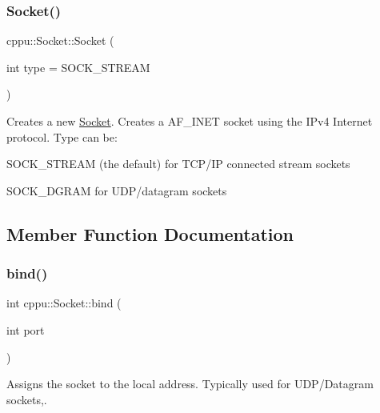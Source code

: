 \subsubsection{\texorpdfstring{Socket()}{Socket()}}
{\footnotesize\ttfamily cppu\+::\+Socket\+::\+Socket (\begin{DoxyParamCaption}\item[{int}]{type = {\ttfamily SOCK\+\_\+STREAM} }\end{DoxyParamCaption})}



Creates a new \mbox{\hyperlink{classcppu_1_1_socket}{Socket}}. Creates a A\+F\+\_\+\+I\+N\+ET socket using the I\+Pv4 Internet protocol. Type can be\+: 


\begin{DoxyItemize}
\item S\+O\+C\+K\+\_\+\+S\+T\+R\+E\+AM (the default) for T\+C\+P/\+IP connected stream sockets
\item S\+O\+C\+K\+\_\+\+D\+G\+R\+AM for U\+D\+P/datagram sockets 
\end{DoxyItemize}

\subsection{Member Function Documentation}
\mbox{\label{classcppu_1_1_socket_a7b876dcaff0babaffde41575f9b19d64}} 
\subsubsection{\texorpdfstring{bind()}{bind()}\hspace{0.1cm}{\footnotesize\ttfamily [1/2]}}
{\footnotesize\ttfamily int cppu\+::\+Socket\+::bind (\begin{DoxyParamCaption}\item[{int}]{port }\end{DoxyParamCaption})\hspace{0.3cm}{\ttfamily [virtual]}}



Assigns the socket to the local address. Typically used for U\+D\+P/\+Datagram sockets,. 


